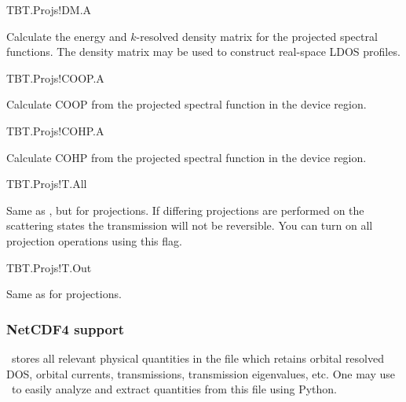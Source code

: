 \begin{fdflogicalF}{TBT.Projs!DM.A}

  Calculate the energy and $k$-resolved density matrix for the
  projected spectral functions. The density matrix may be used to
  construct real-space LDOS profiles.
  
\end{fdflogicalF}

\begin{fdflogicalF}{TBT.Projs!COOP.A}

  Calculate COOP from the projected spectral function in the device
  region.

\end{fdflogicalF}

\begin{fdflogicalF}{TBT.Projs!COHP.A}

  Calculate COHP from the projected spectral function in the device
  region.

\end{fdflogicalF}


\begin{fdflogicalF}{TBT.Projs!T.All}%

  Same as , but for projections. If differing
  projections are performed on the scattering states the transmission
  will not be reversible. You can turn on all projection operations
  using this flag.

\end{fdflogicalF}

\begin{fdflogicalF}{TBT.Projs!T.Out}%

  Same as  for projections. 
  
\end{fdflogicalF}



\subsubsection{NetCDF4 support}

\tbtrans\ stores all relevant physical quantities in the
 file which retains orbital resolved DOS, orbital
currents, transmissions, transmission eigenvalues, etc. One may use
\sisl\ to easily analyze and extract quantities from this file using
Python. 

